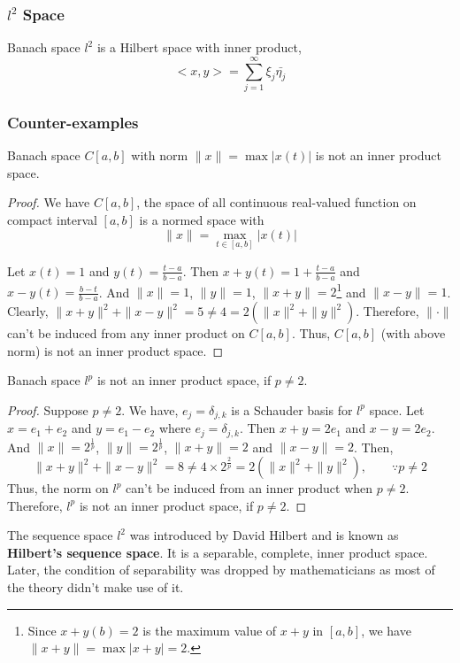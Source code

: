 \subsubsection{$l^2$ Space}
	Banach space $l^2$ is a Hilbert space with inner product,
	\[ <x,y> = \sum_{j=1}^\infty \xi_j \bar{\eta_j} \]
\subsubsection{Counter-examples}
\begin{remark}
	Banach space $C[a,b]$ with norm $\|x\| = \max |x(t)|$ is not an inner product space.
\end{remark}
\begin{proof}
	We have $C[a,b]$, the space of all continuous real-valued function on compact interval $[a,b]$ is a normed space with \[ \|x\| = \max_{t \in [a,b]} |x(t)| \]

	Let $x(t) = 1$ and $y(t) = \frac{t-a}{b-a}$.
	Then $x+y(t) = 1+\frac{t-a}{b-a}$ and $x-y(t) = \frac{b-t}{b-a}$.
	And $\|x\| = 1$, $\|y\| =1$, $\|x+y\| = 2$\dag\footnote{Since $x+y(b) = 2$ is the maximum value of $x+y$ in $[a,b]$, we have $\|x+y\| = \max |x+y| = 2$.} and $\|x-y\| = 1$.
	Clearly, $\|x+y\|^2 + \|x-y\|^2 = 5 \ne 4 = 2(\|x\|^2+\|y\|^2)$.
	Therefore, $\| \cdot \|$ can't be induced from any inner product on $C[a,b]$.
	Thus, $C[a,b]$ (with above norm) is not an inner product space.
\end{proof}

\begin{remark}
	Banach space $l^p$ is not an inner product space, if $p \ne 2$.
\end{remark}
\begin{proof}
	Suppose $p \ne 2$.
	We have, $e_j = \delta_{j,k}$ is a Schauder basis for $l^p$ space.
	Let $x = e_1+e_2$ and $y = e_1-e_2$ where $e_j = \delta_{j,k}$.
	Then $x+y = 2e_1$ and $x-y = 2e_2$.
	And $\|x\| = 2^\frac{1}{p}$, $\|y\| = 2^\frac{1}{p}$, $\|x+y\| = 2$ and $\|x-y\| = 2$.
	Then, 
	\[ \|x+y\|^2+\|x-y\|^2 = 8 \ne 4 \times 2^\frac{2}{p} = 2(\|x\|^2+\|y\|^2), \qquad \because p \ne 2\]
	Thus, the norm on $l^p$ can't be induced from an inner product when $p \ne 2$.
	Therefore, $l^p$ is not an inner product space, if $p \ne 2$.
\end{proof}

\begin{commentary}
\begin{remark}[Hilbert]
	The sequence space $l^2$ was introduced by David Hilbert  and is known as \textbf{Hilbert's sequence space}.
	It is a separable, complete, inner product space.
	Later, the condition of separability was dropped by mathematicians as most of the theory didn't make use of it.
\end{remark}
\end{commentary}

